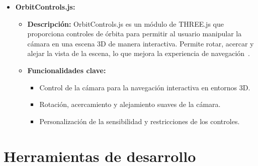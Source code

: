 \documentclass[a4paper, 12pt]{book}
\begin{document}
\begin{itemize}
  \item \textbf{OrbitControls.js:}
    \begin{itemize}
      \item \textbf{Descripción:} OrbitControls.js es un módulo de THREE.js que proporciona controles de órbita para permitir al usuario manipular la cámara 
      en una escena 3D de manera interactiva. Permite rotar, acercar y alejar la vista de la escena, lo que mejora la experiencia de navegación~\cite{Documentacion_Controls}.
      \item \textbf{Funcionalidades clave:}
      \begin{itemize}
        \item Control de la cámara para la navegación interactiva en entornos 3D.
        \item Rotación, acercamiento y alejamiento suaves de la cámara.
        \item Personalización de la sensibilidad y restricciones de los controles.
      \end{itemize}
    \end{itemize}
\end{itemize}


\section{Herramientas de desarrollo} 
\label{sec:herramientas}
\end{document}
